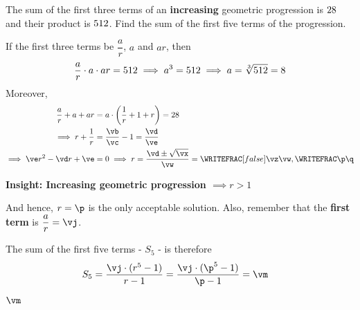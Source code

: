 

\FRACTIONSIMPLIFY\vs\va\vb\vc
\FRACMINUS\vb{}\vd\ve

\MULTIPLY{}\vw
\EXPR[0]
\SQRT\vx\vv
\ADD\vd\vv\vy
\SUBTRACT\vd\vv\vz

\FRACTIONSIMPLIFY\vy\vw\p\q

\DIVIDE\va\p\vj
\POWER{}\vk
\EXPR[0]

\question[3] The sum of the first three terms of an \textbf{increasing} geometric progression 
is $28$ and their product is $512$. Find the sum of the first five terms of the progression.

\watchout

\begin{solution}[\halfpage]
	If the first three terms be $\dfrac{a}{r}$, $a$ and $ar$, then 
  \[ \dfrac{a}{r}\cdot a \cdot ar = 512 \implies a^3 = 512 \implies a = \sqrt[3]{512} = 8 \] 
  Moreover, 
	\begin{align}
		\dfrac{a}{r} + a + ar &= a\cdot\left(\dfrac{1}{r} + 1 + r \right) = \vs \\ 
    \implies r + \dfrac{1}{r} &= \dfrac\vb\vc - 1 = \dfrac\vd\ve \\
    \implies \ve r^2 - \vd r + \ve &= 0\implies r = \dfrac{\vd\pm\sqrt{\vx}}\vw = 
    \WRITEFRAC[false]\vz\vw, \WRITEFRAC\p\q 
	\end{align}
	
  \textbf{Insight: Increasing geometric progression $\implies r > 1$}

   And hence, $r = \p$ is the only acceptable solution. Also, remember that the \textbf{first term} is 
   $\dfrac{a}{r} = \vj$.

   The sum of the first five terms - $S_5$ - is therefore 
	\begin{align}
		S_5 &= \dfrac{\vj\cdot(r^5 - 1)}{r-1} = \dfrac{\vj \cdot(\p^5 - 1)}{\p - 1} = \vm
	\end{align}
\end{solution}
\ifprintanswers\begin{codex}$\vm$\end{codex}\fi
